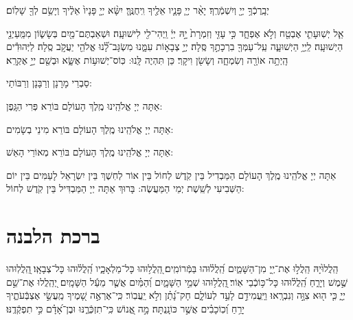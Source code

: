 \documentclass[twoside, openany, parskip=half, 11pt]{book}
\begin{document}
	יְבָֽרֶכְֿךָ֥ יְיָ֖ וְיִשְׁמְֿרֶֽךָ׃
	יָאֵ֨ר יְיָ֧ פָּנָ֛יו אֵלֶ֖יךָ וִֽיחֻנֶּֽךָּ׃
 יִשָּׂ֨א יְיָ֤ פָּנָיו֙ אֵלֶ֔יךָ וְיָשֵׂ֥ם לְךָ֖ שָׁלֽוֹם׃

\sepline


 אֵ֧ל יְשֽׁוּעָתִ֛י אֶבְטַ֖ח וְלֹ֣א אֶפְחָ֑ד כִּ֣י עָזִּ֤י וְזִמְרָת֙ יָ֣הּ יְיָ֔ וַֽיְהִי־לִ֖י לִישׁוּעָֽה׃ וּשְׁאַבְתֶּם־מַ֖יִם בְּשָׂשׂ֑וֹן מִמַּֽעַיְנֵ֖י הַיְשׁוּעָֽה׃ 
לַֽיְיָ֥
 הַיְשׁוּעָ֑ה עַֽל־עַמְּךָ֖ בִרְכָתֶ֣ךָ סֶּֽלָה׃
יְיָ֣ 
צְבָא֣וֹת עִמָּ֑נוּ מִשְׂגָּב־לָ֝֗נוּ אֱלֹהֵ֖י יַעֲקֹ֣ב סֶֽלָה׃ 
לַיְּהוּדִ֕ים הָֽיְתָ֥ה אוֹרָ֖ה וְשִׂמְחָ֑ה וְשָׂשׂ֖ן וִיקָֽר׃ כֵּן תִּהְיֶה לָּֽנוּ: כּֽוֹס־יְשׁוּע֥וֹת אֶשָּׂ֑א וּבְשֵׁ֖ם יְיָ֣ אֶקְרָֽא׃


\begin{scriptsize}
סַבְרֵי מָרָנָן וְרַבָּנָן וְרַבּוֹתַי: \\
\end{scriptsize}
  אַתָּה יְיָ אֱלֹהֵֽינוּ מֶֽלֶךְ הָעוֹלָם בּוֹרֵא פְּרִי הַגָּֽפֶן:

   אַתָּה יְיָ אֱלֹהֵֽינוּ מֶֽלֶךְ הָעוֹלָם בּוֹרֵא מִינֵי בְשָׂמִים:

   אַתָּה יְיָ אֱלֹהֵֽינוּ מֶֽלֶךְ הָעוֹלָם בּוֹרֵא מְאוֹרֵי הָאֵשׁ:

   אַתָּה יְיָ אֱלֹהֵֽינוּ מֶֽלֶךְ הָעוֹלָם הַמַּבְדִיל בֵּין קֹֽדֶשׁ לְחוֹל בֵּין אוֹר לְחֽשֶׁךְ בֵּין יִשְׂרָאֵל לָעַמִּים בֵּין יוֹם הַשְּׁבִיעִי לְשֵֽׁשֶׁת יְמֵי הַמַּעֲשֶׂה: בָּרוּךְ אַתָּה יְיָ הַמַּבְדִּיל בֵּין קֹֽדֶשׁ לְחוֹל:
 \clearpage
 
 \vspace{-1.3\baselineskip}
\section[ברכת הלבנה]{ ברכת הלבנה }

  הַֽלֲלוּ֙יָהּ
   הַֽלֲל֣וּ אֶת־יְ֖יָ מִן־הַשָּׁמַ֑יִם הַֽ֝לֲל֗וּהוּ בַּמְּֿרוֹמִֽים׃
  ֭הַֽלֲל֥וּהוּ כָּל־מַלְאָכָ֑יו הַֽ֝לֲל֗וּהוּ כָּל־צְבָאָֽו׃
   ֖הַֽלֲלֽוּהוּ שֶׁ֣מֶשׁ וְיָרֵ֑חַ הַֽ֝לֲל֗וּהוּ כָּל־כּ֥וֹכְֿבֵי אֽוֹר׃
    ֖הַֽלֲל֥וּהוּ שְׁמֵ֣י הַשָּׁמָ֑יִם וְ֝הַמַּ֗יִם אֲשֶׁ֤ר מֵעַ֬ל הַשָּׁמָֽיִם׃
     יְ֭הַֽלֲלוּ אֶת־שֵׁ֣ם יְיָ֑ כִּ֤י ה֖וּא צִוָּ֣ה וְנִבְרָֽאוּ׃
      וַיַּֽעֲמִידֵ֣ם לָעַ֣ד לְעוֹלָ֑ם חָק־נָ֝תַ֗ן וְלֹ֣א יַֽעֲבֽוֹר׃
 כִּֽי־אֶרְאֶ֣ה
  שָׁ֭מֶיךָ מַֽעֲשֵׂ֣י אֶצְבְּֿעֹתֶ֑יךָ יָרֵ֥חַ וְ֝כֽוֹכָבִ֗ים אֲשֶׁ֣ר כּוֹנָֽנְתָּה׃
  מָ֣ה אֱ֭נוֹשׁ כִּֽי־תִזְכְּֿרֶ֑נּוּ וּבֶן־אָ֝דָ֗ם כִּ֣י תִפְקְֿדֶֽנּוּ׃
\end{document}
